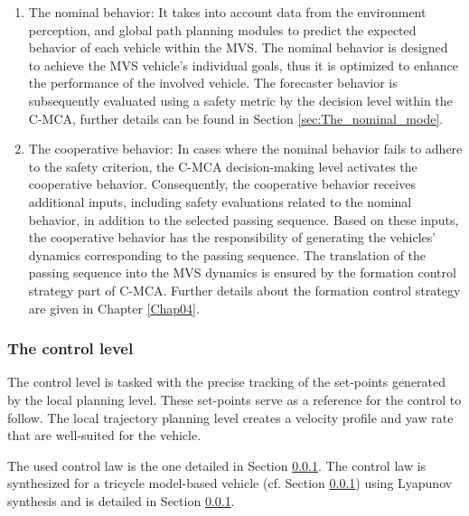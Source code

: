 \begin{enumerate}
\item The nominal behavior: It takes into account data from the environment perception, and global path planning modules to predict the expected behavior of each vehicle within the MVS. The nominal behavior is designed to achieve the MVS vehicle's individual goals, thus it is optimized to enhance the performance of the involved vehicle. The forecaster behavior is subsequently evaluated using a safety metric by the decision level within the C-MCA, further details can be found in Section \ref{sec:The_nominal_mode}. 

\item The cooperative behavior: In cases where the nominal behavior fails to adhere to the safety criterion, the C-MCA decision-making level activates the cooperative behavior. Consequently, the cooperative behavior receives additional inputs, including safety evaluations related to the nominal behavior, in addition to the selected passing sequence. Based on these inputs, the cooperative behavior has the responsibility of generating the vehicles' dynamics corresponding to the passing sequence. The translation of the passing sequence into the MVS dynamics is ensured by the formation control strategy part of C-MCA.  Further details about the formation control strategy are given in Chapter \ref{Chap04}. 




\end{enumerate}






\subsubsection{The control level} \label{sec:control_law}
The control level is tasked with the precise tracking of the set-points generated by the local planning level. These set-points serve as a reference for the control to follow. The local trajectory planning level creates a velocity profile and yaw rate that are well-suited for the vehicle.

The used control law is the one detailed in Section \ref{sec:control_law}. The control law is synthesized for a tricycle model-based vehicle (cf. Section \ref{sec:control_law}) using Lyapunov  synthesis and is detailed in Section \ref{sec:control_law}. 





